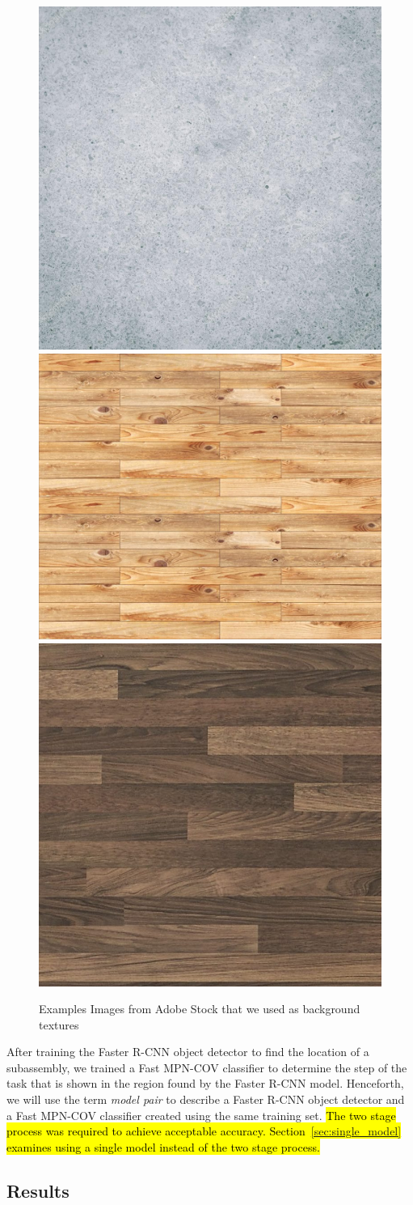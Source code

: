 \begin{figure}
  \includegraphics[width=0.33\columnwidth]{figures/adobe_stock/concrete.jpg}
  \includegraphics[width=0.33\columnwidth]{figures/adobe_stock/wood1.jpg}
  \includegraphics[width=0.33\columnwidth]{figures/adobe_stock/wood2.jpg}
  \caption{
    Examples Images from Adobe Stock that we used as background textures
  }\label{fig:adobe_backgrounds}
\end{figure}

After training the Faster R-CNN object detector to find the location of a
subassembly, we trained a Fast MPN-COV classifier to determine the step of the
task that is shown in the region found by the Faster R-CNN model.
Henceforth, we will use the term \emph{model pair} to describe a Faster R-CNN object
detector and a Fast MPN-COV classifier created using the same training set.
\hl{The two stage process was required to achieve acceptable accuracy.
  Section~{\ref{sec:single_model}} examines using a single model instead of the
  two stage process.
}

\subsection{Results}

